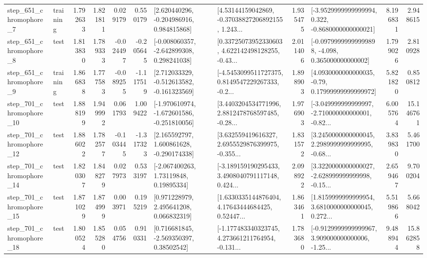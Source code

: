\begin{tabular}{llrrrrllrlrr}
   step\_651\_chromophore\_7 &  training &      1.792633 &    1.821811 &      0.029179 &  0.550179 &    [2.620440296, -0.204986916, 0.984815868] &  [4.53144159042869, -0.37038827206892155, 1.243... &       1.935475 &  [-3.9529999999999994, 0.322, -0.8680000000000021] &            8.196831 &          2.948615 \\
   step\_651\_chromophore\_8 &      test &      1.813830 &    1.789333 &     -0.024497 & -0.205645 &   [-0.008060357, -2.642899308, 0.298241038] &  [0.33725073952330603, 4.622142498128255, -0.43... &       2.011406 &  [-0.09799999999999898, -4.098, 0.365000000000002] &            1.799026 &          2.810928 \\
   step\_651\_chromophore\_9 &  training &      1.866838 &    1.777583 &     -0.089255 & -1.117519 &   [2.712033329, -0.512613582, -0.161323569] &  [-4.5453099511727375, 0.8149547229267333, -0.2... &       1.898903 &   [4.0930000000000035, -0.79, 0.17999999999999972] &            5.821820 &          0.850812 \\
  step\_701\_chromophore\_10 &      test &      1.888199 &    1.949992 &      0.061793 &  1.009422 &  [-1.970610974, -1.672601586, -0.251810056] &  [3.4403204534771996, 2.8812478768597485, -0.28... &       1.976903 &  [-3.049999999999997, -2.710000000000001, -0.82... &            6.005764 &         15.146761 \\
  step\_701\_chromophore\_12 &      test &      1.886022 &    1.782577 &     -0.103445 & -1.317323 &    [2.165592797, 1.600861628, -0.290174338] &  [3.632559419616327, 2.6955529876399975, -0.355... &       1.831572 &  [3.2450000000000045, 2.2989999999999995, -0.68... &            3.839830 &          5.461700 \\
  step\_701\_chromophore\_14 &      test &      1.820307 &    1.848279 &      0.027973 &  0.533197 &      [-2.067400263, 1.73119848, 0.19895334] &  [-3.189159190295433, 3.4908040791117148, 0.424... &       2.098922 &  [3.3220000000000027, -2.628999999999998, -0.15... &            2.659467 &          9.700204 \\
  step\_701\_chromophore\_15 &      test &      1.871029 &    1.874999 &      0.003971 &  0.195219 &     [0.971228979, 2.495641208, 0.066832319] &  [1.6330335144876404, 4.17643444684425, 0.52447... &       1.863461 &  [1.8159999999999954, 3.6810000000000045, 0.272... &            5.519866 &          5.668042 \\
  step\_701\_chromophore\_18 &      test &      1.800524 &    1.855280 &      0.054756 &  0.910331 &     [0.716681845, -2.569350397, 0.38502542] &  [-1.177483340323745, 4.273661211764954, -0.131... &       1.783680 &  [-0.9129999999999967, 3.909000000000006, -1.25... &            9.488944 &         15.862858 \\

\end{tabular}
